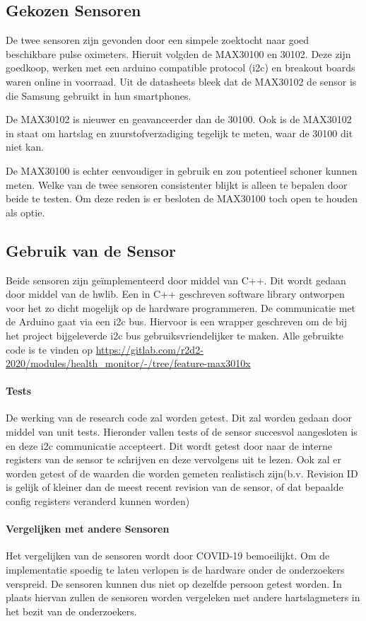 \documentclass[11pt]{article}
\begin{document}
\subsection{Gekozen Sensoren}
De twee sensoren zijn gevonden door een simpele zoektocht naar goed beschikbare pulse oximeters. Hieruit volgden de MAX30100 en 30102. Deze zijn goedkoop, werken met een arduino compatible protocol (i2c) en breakout boards waren online in voorraad.
Uit de datasheets bleek dat de MAX30102 de sensor is die Samsung gebruikt in hun smartphones.

De MAX30102 is nieuwer en geavanceerder dan de 30100. Ook is de MAX30102 in staat om hartslag en zuurstofverzadiging tegelijk te meten, waar de 30100 dit niet kan.

De MAX30100 is echter eenvoudiger in gebruik en zou potentieel schoner kunnen meten. Welke van de twee sensoren consistenter blijkt is alleen te bepalen door beide te testen. Om  deze reden is er besloten de MAX30100 toch open te houden als optie. 

\subsection{Gebruik van de Sensor}\label{subsec:gebruik van de sensor}
Beide sensoren zijn geïmplementeerd door middel van C++. Dit wordt gedaan door middel van de hwlib. Een in C++ geschreven software library ontworpen voor het zo dicht mogelijk op de hardware programmeren. De communicatie met de Arduino gaat via een i2c bus. Hiervoor is een wrapper geschreven om de bij het project bijgeleverde i2c bus gebruiksvriendelijker te maken. Alle gebruikte code is te vinden op \url{https://gitlab.com/r2d2-2020/modules/health_monitor/-/tree/feature-max3010x}

\paragraph{Tests}
De werking van de research code zal worden getest. Dit zal worden gedaan door middel van unit tests. Hieronder vallen tests of de sensor succesvol aangesloten is en deze i2c communicatie accepteert. Dit wordt getest door naar de interne registers van de sensor te schrijven en deze vervolgens uit te lezen. Ook zal er worden getest of de waarden die worden gemeten realistisch zijn(b.v. Revision ID is gelijk of  kleiner dan de meest recent revision van de sensor, of dat bepaalde config registers veranderd kunnen worden)


\paragraph{Vergelijken met andere Sensoren}
Het vergelijken van de sensoren wordt door COVID-19 bemoeilijkt. Om de implementatie spoedig te laten verlopen is de hardware onder de onderzoekers verspreid. De sensoren kunnen dus niet op dezelfde persoon getest worden. In plaats hiervan zullen de sensoren worden vergeleken met andere hartslagmeters in het bezit van de onderzoekers.
\end{document}
